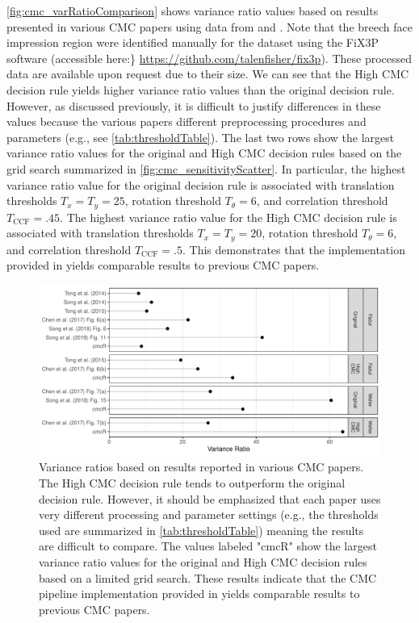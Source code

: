 \autoref{fig:cmc_varRatioComparison} shows variance ratio values based
on results presented in various CMC papers using data from
\citet{fadul_empirical_2011} and \citet{weller_2012}. Note that the
breech face impression region were identified manually for the
\citet{weller_2012} dataset using the FiX3P software (accessible here:\}
\url{https://github.com/talenfisher/fix3p}). These processed data are
available upon request due to their size. We can see that the High CMC
decision rule yields higher variance ratio values than the original
decision rule. However, as discussed previously, it is difficult to
justify differences in these values because the various papers different
preprocessing procedures and parameters (e.g., see
\autoref{tab:thresholdTable}). The last two rows show the largest
variance ratio values for the original and High CMC decision rules based
on the grid search summarized in \autoref{fig:cmc_sensitivityScatter}.
In particular, the highest variance ratio value for the original
decision rule is associated with translation thresholds
\(T_x = T_y = 25\), rotation threshold \(T_\theta = 6\), and correlation
threshold \(T_{\text{CCF}} = .45\). The highest variance ratio value for
the High CMC decision rule is associated with translation thresholds
\(T_x = T_y = 20\), rotation threshold \(T_\theta = 6\), and correlation
threshold \(T_{\text{CCF}} = .5\). This demonstrates that the
implementation provided in  yields comparable results to
previous CMC papers.

\begin{Schunk}
\begin{figure}[htbp]

\includegraphics[width=\textwidth]{figures/cmcr-unnamed-chunk-21-1} \hfill{}

\caption{\label{fig:cmc_varRatioComparison} Variance ratios based on results reported in various CMC papers. The High CMC decision rule tends to outperform the original decision rule. However, it should be emphasized that each paper uses very different processing and parameter settings (e.g., the thresholds used are summarized in \autoref{tab:thresholdTable}) meaning the results are difficult to compare. The values labeled "cmcR" show the largest variance ratio values for the original and High CMC decision rules based on a limited grid search. These results indicate that the CMC pipeline implementation provided in  yields comparable results to previous CMC papers.}\label{fig:unnamed-chunk-21}
\end{figure}
\end{Schunk}


